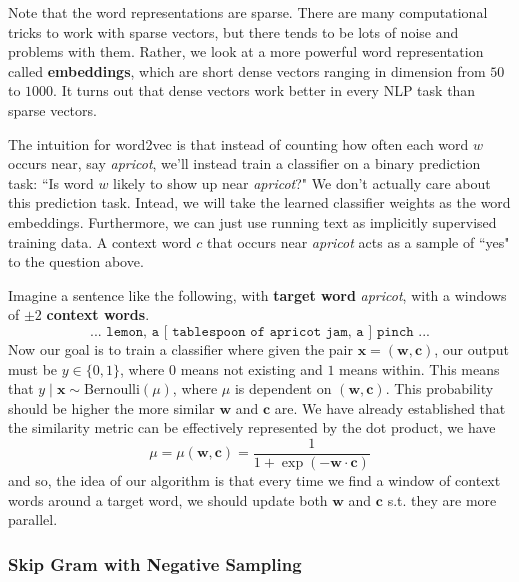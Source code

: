 \documentclass{article}
\begin{document}
      Note that the word representations are sparse. There are many computational tricks to work with sparse vectors, but there tends to be lots of noise and problems with them. Rather, we look at a more powerful word representation called \textbf{embeddings}, which are short dense vectors ranging in dimension from $50$ to $1000$. It turns out that dense vectors work better in every NLP task than sparse vectors. 

      The intuition for word2vec is that instead of counting how often each word $w$ occurs near, say \textit{apricot}, we'll instead train a classifier on a binary prediction task: ``Is word $w$ likely to show up near \textit{apricot}?" We don't actually care about this prediction task. Intead, we will take the learned classifier weights as the word embeddings. Furthermore, we can just use running text as implicitly supervised training data. A context word $c$ that occurs near \textit{apricot} acts as a sample of ``yes" to the question above. 

      Imagine a sentence like the following, with \textbf{target word} \textit{apricot}, with a windows of $\pm2$ \textbf{context words}. 
      \[\texttt{... lemon, a [ tablespoon of apricot jam, a ] pinch ...}\]
      Now our goal is to train a classifier where given the pair $\mathbf{x} = (\mathbf{w}, \mathbf{c})$, our output must be $y \in \{0, 1\}$, where $0$ means not existing and $1$ means within. This means that $y \mid \mathbf{x} \sim \mathrm{Bernoulli}(\mu)$, where $\mu$ is dependent on $(\mathbf{w}, \mathbf{c})$. This probability should be higher the more similar $\mathbf{w}$ and $\mathbf{c}$ are. We have already established that the similarity metric can be effectively represented by the dot product, we have 
      \[\mu = \mu(\mathbf{w}, \mathbf{c}) = \frac{1}{1 + \exp(- \mathbf{w} \cdot \mathbf{c})}\]
      and so, the idea of our algorithm is that every time we find a window of context words around a target word, we should update both $\mathbf{w}$ and $\mathbf{c}$ s.t. they are more parallel. 

    \subsubsection{Skip Gram with Negative Sampling}
\end{document}

